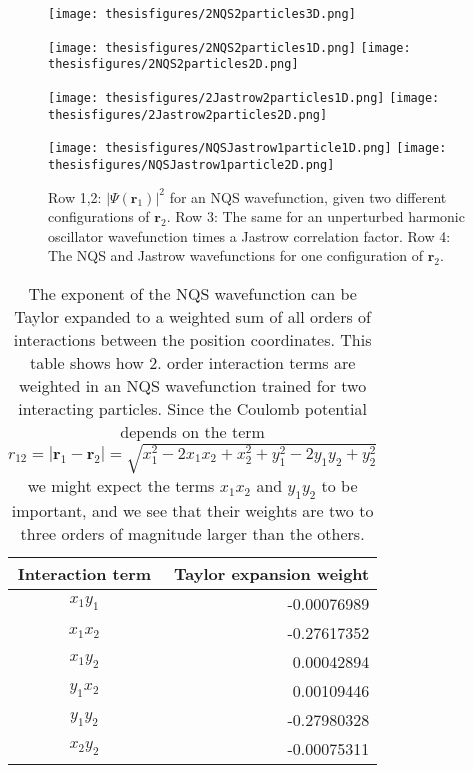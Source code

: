 \documentclass[twoside,english]{uiofysmaster}
\newcommand{\ra}[1]{\renewcommand{\arraystretch}{#1}}
\begin{document}
\begin{figure}
\centering
\texttt{[image: thesisfigures/2NQS2particles3D.png]}

\texttt{[image: thesisfigures/2NQS2particles1D.png]}
\texttt{[image: thesisfigures/2NQS2particles2D.png]}

\texttt{[image: thesisfigures/2Jastrow2particles1D.png]}
\texttt{[image: thesisfigures/2Jastrow2particles2D.png]}

\texttt{[image: thesisfigures/NQSJastrow1particle1D.png]}
\texttt{[image: thesisfigures/NQSJastrow1particle2D.png]}

\caption{Row 1,2: $|\Psi(\bm{r}_1)|^2$ for an NQS wavefunction, given two different configurations of $\bm{r}_2$. Row 3: The same for an unperturbed harmonic oscillator wavefunction times a Jastrow correlation factor. Row 4: The NQS and Jastrow wavefunctions for one configuration of $\bm{r}_2$.}
 \label{fig:ValidationDifferentLR}
\end{figure}

\begin{table*}\centering
\ra{1.3}
\caption{The exponent of the NQS wavefunction can be Taylor expanded to a weighted sum of all orders of interactions between the position coordinates. This table shows how 2. order interaction terms are weighted in an NQS wavefunction trained for two interacting particles. Since the Coulomb potential depends on the term $r_{12}=|\bm{r}_1 - \bm{r}_2| = \sqrt{x_1^2 - 2x_1x_2 + x_2^2 + y_1^2 - 2y_1y_2 + y_2^2}$ we might expect the terms $x_1 x_2$ and $y_1 y_2$ to be important, and we see that their weights are two to three orders of magnitude larger than the others.} 
\label{tabsteptest2}
\begin{tabular}{cr}
\toprule
\toprule
Interaction term & Taylor expansion weight \\ 
\midrule 
$x_1 y_1$  & -0.00076989 \\
$x_1 x_2$  & -0.27617352 \\
$x_1 y_2$  &  0.00042894 \\
$y_1 x_2$  &  0.00109446 \\
$y_1 y_2$  & -0.27980328 \\
$x_2 y_2$  & -0.00075311 \\
\bottomrule
\bottomrule
\end{tabular}
\end{table*}



\newpage

\end{document}
